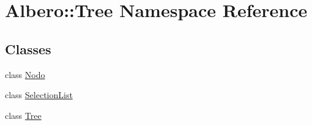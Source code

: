 \hypertarget{namespaceAlbero_1_1Tree}{
\section{Albero::Tree Namespace Reference}
\label{namespaceAlbero_1_1Tree}
}
\subsection*{Classes}
\begin{DoxyCompactItemize}
\item 
class \hyperlink{classAlbero_1_1Tree_1_1Nodo}{Nodo}
\item 
class \hyperlink{classAlbero_1_1Tree_1_1SelectionList}{SelectionList}
\item 
class \hyperlink{classAlbero_1_1Tree_1_1Tree}{Tree}
\end{DoxyCompactItemize}
